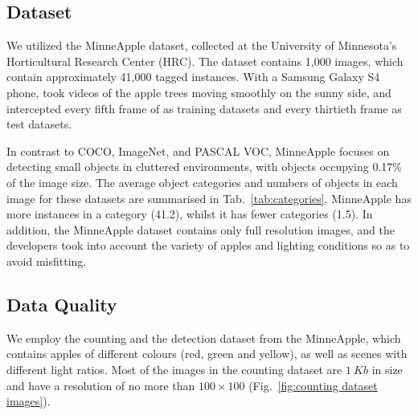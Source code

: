 \subsection{Dataset}
We utilized the MinneApple dataset, collected at the University of Minnesota's Horticultural Research Center (HRC). The dataset contains 1,000 images, which contain approximately 41,000 tagged instances. With a Samsung Galaxy S4 phone, \cite{Haeni2020} took videos of the apple trees moving smoothly on the sunny side, and intercepted every fifth frame of as training datasets and every thirtieth frame as test datasets.

In contrast to COCO, ImageNet, and PASCAL VOC, MinneApple focuses on detecting small objects in cluttered environments, with objects occupying 0.17\% of the image size. The average object categories and numbers of objects in each image for these datasets are summarised in Tab.~\ref{tab:categories}. MinneApple has more instances in a category (41.2), whilst it has fewer categories (1.5). In addition, the MinneApple dataset contains only full resolution images, and the developers took into account the variety of apples and lighting conditions so as to avoid misfitting. 

\begin{table}[htb]
\centering
\caption{Number of categories contained in each image and the number of instances of each category of the four datasets~\citep{Haeni2020}}
\label{tab:categories}
\end{table}


\subsection{Data Quality}
We employ the counting and the detection dataset from the MinneApple, which contains apples of different colours (red, green and yellow), as well as scenes with different light ratios. Most of the images in the counting dataset are $1\ Kb$ in size and have a resolution of no more than $100\times 100$ (Fig.~\ref{fig:counting dataset images}).

